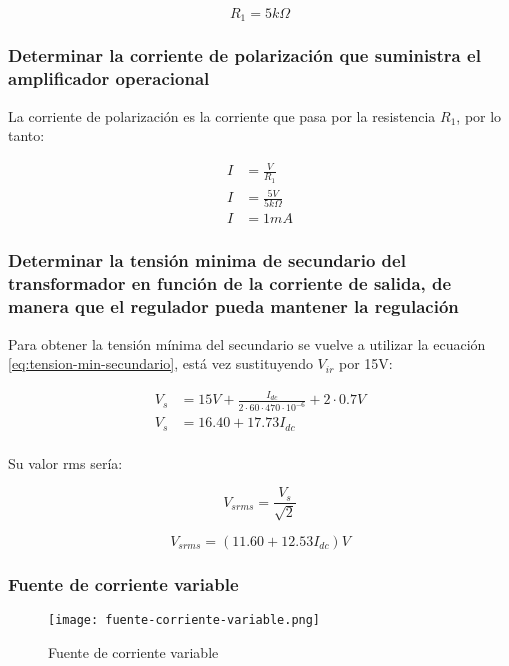 \begin{equation}
    \boxed{R_{1} = 5k \Omega}
\end{equation}

\subsubsection*{Determinar la corriente de polarización que suministra el amplificador operacional}

La corriente de polarización es la corriente que pasa por la resistencia $R_1$, por lo tanto:

\begin{align*}
    I &= \frac{V}{R_1}  \\
    I &= \frac{5V}{5k \Omega} \\
    I &= 1mA
\end{align*}

\subsubsection*{Determinar la tensión minima de secundario del transformador en función de la corriente de salida, de manera que el regulador pueda mantener la regulación}

Para obtener la tensión mínima del secundario se vuelve a utilizar la ecuación \ref{eq:tension-min-secundario}, está vez sustituyendo $V_{ir}$ por 15V:

\begin{align*}
    V_s &= 15V + \frac{I_{dc}}{2\cdot 60 \cdot 470\cdot 10^{-6}} + 2 \cdot 0.7 V \\
    V_s &= 16.40 + 17.73  I_{dc} \\
\end{align*}

Su valor rms sería:

$$ V_{srms} = \frac{V_s}{\sqrt{2}} $$

$$ V_{srms} = (11.60 + 12.53 I_{dc} )V $$

\subsubsection{Fuente de corriente variable}

\begin{figure}[ht]
    \centering
    \texttt{[image: fuente-corriente-variable.png]}
    \caption{Fuente de corriente variable}
    \label{fig:fuente-corriente-variable}
\end{figure}

